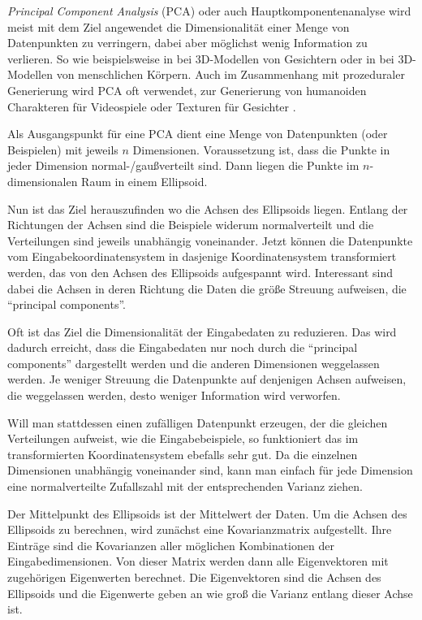  
 \emph{Principal Component Analysis} (PCA) oder auch Hauptkomponentenanalyse \cite{PCA} wird meist mit dem Ziel angewendet die Dimensionalität einer Menge von Datenpunkten zu verringern, dabei aber möglichst wenig Information zu verlieren.
 So wie beispielsweise in \cite{PCA_faces} bei 3D-Modellen von Gesichtern oder in \cite{PCA_bodies} bei 3D-Modellen von menschlichen Körpern. Auch im Zusammenhang mit prozeduraler Generierung wird PCA oft verwendet, \zb zur Generierung von humanoiden Charakteren für Videospiele \cite{ProceduralCharacterGeneration} oder Texturen für Gesichter \cite{GeneratingFacialTextures}.
 
 Als Ausgangspunkt für eine PCA dient eine Menge von Datenpunkten (oder Beispielen) mit jeweils $n$ Dimensionen. Voraussetzung ist, dass die Punkte in jeder Dimension normal-/gaußverteilt sind. Dann liegen die Punkte im $n$-dimensionalen Raum in einem Ellipsoid.
 
 Nun ist das Ziel herauszufinden wo die Achsen des Ellipsoids liegen. Entlang der Richtungen der Achsen sind die Beispiele widerum normalverteilt und die Verteilungen sind jeweils unabhängig voneinander.
 Jetzt können die Datenpunkte vom Eingabekoordinatensystem in dasjenige Koordinatensystem transformiert werden, das von den Achsen des Ellipsoids aufgespannt wird. Interessant sind dabei die Achsen in deren Richtung die Daten die größe Streuung aufweisen, die "`principal components"'. 
 
 Oft ist das Ziel die Dimensionalität der Eingabedaten zu reduzieren. Das wird dadurch erreicht, dass die Eingabedaten nur noch durch die "`principal components"' dargestellt werden und die anderen Dimensionen weggelassen werden. Je weniger Streuung die Datenpunkte auf denjenigen Achsen aufweisen, die weggelassen werden, desto weniger Information wird verworfen.
 
 Will man stattdessen einen zufälligen Datenpunkt erzeugen, der die gleichen Verteilungen aufweist, wie die Eingabebeispiele, so funktioniert das im transformierten Koordinatensystem ebefalls sehr gut. Da die einzelnen Dimensionen unabhängig voneinander sind, kann man einfach für jede Dimension eine normalverteilte Zufallszahl mit der entsprechenden Varianz ziehen.
 
 Der Mittelpunkt des Ellipsoids ist der Mittelwert der Daten.
 Um die Achsen des Ellipsoids zu berechnen, wird zunächst eine Kovarianzmatrix aufgestellt. Ihre Einträge sind die Kovarianzen aller möglichen Kombinationen der Eingabedimensionen. Von dieser Matrix werden dann alle Eigenvektoren mit zugehörigen Eigenwerten berechnet.
 Die Eigenvektoren sind die Achsen des Ellipsoids und die Eigenwerte geben an wie groß die Varianz entlang dieser Achse ist.
 

